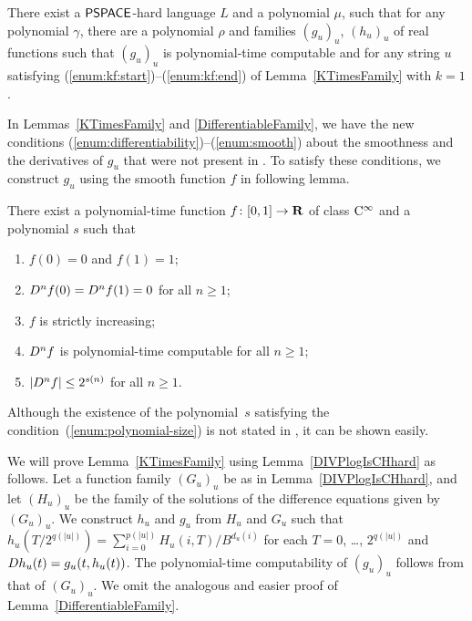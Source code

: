 \begin{lemma}
 \label{DifferentiableFamily}
 There exist a $\mathsf{PSPACE}$-hard language $L$ and a polynomial $\mu$,
 such that for any polynomial $\gamma$,
 there are a polynomial $\rho$ and families $(g_u)_u$, $(h_u)_u$ of real functions
 such that $(g_u)_u$ is polynomial-time computable and for any string $u$
 satisfying (\ref{enum:kf:start})--(\ref{enum:kf:end}) of Lemma~\ref{KTimesFamily} with $k = 1$.
\end{lemma}


In Lemmas~\ref{KTimesFamily} and \ref{DifferentiableFamily}, 
we have the new conditions (\ref{enum:differentiability})--(\ref{enum:smooth})
about the smoothness and the derivatives of $g_u$ 
that were not present in \cite[Lemma 4.1]{kawamura2010lipschitz}.
To satisfy these conditions,
we construct $g_u$ using the smooth function $f$ in following lemma.

\begin{lemma}
 \label{SmoothFunction}
 There exist a polynomial-time function $f \colon [0, 1] \to \mathbf R$ of class $\mathrm C^\infty$ and a polynomial $s$ such that
  \begin{enumerate}
   \item $f(0) = 0$ and $f(1) = 1$;
   \item $D ^n f (0) = D ^n f (1) = 0$ for all $n \ge 1$;
   \item $f$ is strictly increasing;
   \item $D ^n f$ is polynomial-time computable for all $n \ge 1$;
   \item \label{enum:polynomial-size}
	 $|D^n f| \le 2^{s(n)}$ for all $n \ge 1$. 
  \end{enumerate}
 \end{lemma}

Although the existence of the polynomial~$s$ satisfying the condition~(\ref{enum:polynomial-size}) is not stated in \cite[Lemma 3.6]{ko1991complexity},
it can be shown easily.

We will prove Lemma~\ref{KTimesFamily} using Lemma~\ref{DIVPlogIsCHhard} as follows.
Let a function family $(G_u)_u$ be as in Lemma~\ref{DIVPlogIsCHhard},
and let $(H_u)_u$ be the family of the solutions of the difference equations given by $(G_u)_u$.
We construct $h_u$ and $g_u$ from $H_u$ and $G_u$ 
such that $h_u(T/2^{q(|u|)}) = \sum^{p(|u|)}_{i = 0} H_u(i, T)/B^{d_u(i)}$ for each $T = 0$, \ldots, $2^{q(|u|)}$
and $D h_u(t) = g_u(t, h_u(t))$.
The polynomial-time computability of $(g_u)_u$ follows from that of $(G_u)_u$.
We omit the analogous and easier proof of Lemma~\ref{DifferentiableFamily}.

